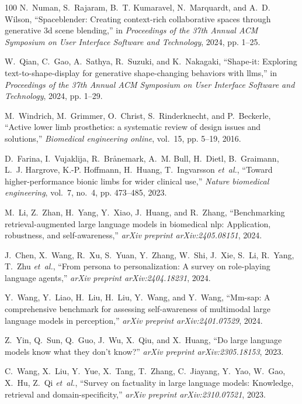\documentclass[10pt,journal,compsoc]{IEEEtran}
\begin{document}
\begin{thebibliography}{100}
	N.~Numan, S.~Rajaram, B.~T. Kumaravel, N.~Marquardt, and A.~D. Wilson,
	``Spaceblender: Creating context-rich collaborative spaces through generative
	3d scene blending,'' in \emph{Proceedings of the 37th Annual ACM Symposium on
		User Interface Software and Technology}, 2024, pp. 1--25.
	
	W.~Qian, C.~Gao, A.~Sathya, R.~Suzuki, and K.~Nakagaki, ``Shape-it: Exploring
	text-to-shape-display for generative shape-changing behaviors with llms,'' in
	\emph{Proceedings of the 37th Annual ACM Symposium on User Interface Software
		and Technology}, 2024, pp. 1--29.
	
	M.~Windrich, M.~Grimmer, O.~Christ, S.~Rinderknecht, and P.~Beckerle, ``Active
	lower limb prosthetics: a systematic review of design issues and solutions,''
	\emph{Biomedical engineering online}, vol.~15, pp. 5--19, 2016.
	
	D.~Farina, I.~Vujaklija, R.~Br{\aa}nemark, A.~M. Bull, H.~Dietl, B.~Graimann,
	L.~J. Hargrove, K.-P. Hoffmann, H.~Huang, T.~Ingvarsson \emph{et~al.},
	``Toward higher-performance bionic limbs for wider clinical use,''
	\emph{Nature biomedical engineering}, vol.~7, no.~4, pp. 473--485, 2023.
	
	M.~Li, Z.~Zhan, H.~Yang, Y.~Xiao, J.~Huang, and R.~Zhang, ``Benchmarking
	retrieval-augmented large language models in biomedical nlp: Application,
	robustness, and self-awareness,'' \emph{arXiv preprint arXiv:2405.08151},
	2024.
	
	J.~Chen, X.~Wang, R.~Xu, S.~Yuan, Y.~Zhang, W.~Shi, J.~Xie, S.~Li, R.~Yang,
	T.~Zhu \emph{et~al.}, ``From persona to personalization: A survey on
	role-playing language agents,'' \emph{arXiv preprint arXiv:2404.18231}, 2024.
	
	Y.~Wang, Y.~Liao, H.~Liu, H.~Liu, Y.~Wang, and Y.~Wang, ``Mm-sap: A
	comprehensive benchmark for assessing self-awareness of multimodal large
	language models in perception,'' \emph{arXiv preprint arXiv:2401.07529},
	2024.
	
	Z.~Yin, Q.~Sun, Q.~Guo, J.~Wu, X.~Qiu, and X.~Huang, ``Do large language models
	know what they don't know?'' \emph{arXiv preprint arXiv:2305.18153}, 2023.
	
	C.~Wang, X.~Liu, Y.~Yue, X.~Tang, T.~Zhang, C.~Jiayang, Y.~Yao, W.~Gao, X.~Hu,
	Z.~Qi \emph{et~al.}, ``Survey on factuality in large language models:
	Knowledge, retrieval and domain-specificity,'' \emph{arXiv preprint
		arXiv:2310.07521}, 2023.
	

\end{thebibliography}
\end{document}
